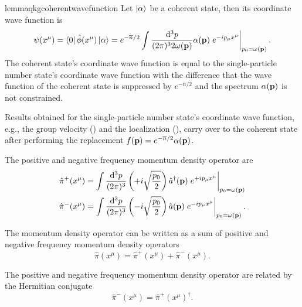\begin{restatable}{lemma}{qkgcoherentwavefunction}\label{thm:coherent_state_wave_function}
	Let $\ket{\alpha}$ be a coherent state, then its coordinate wave function is
	\begin{equation}
		\psi(x^\mu)
		=
		\bra{0}
		\hat\phi(x^\mu)
		\ket{\alpha}
		=
		e^{-\overline{n}/2}
		\int\frac{\dd[3]{p}}{(2\pi)^32\omega(\vb{p})}
		\alpha(\vb{p})
		\eval{e^{-ip_\mu x^\mu}}_{p_0=\omega(\vb{p})}
		.
	\end{equation}
	The coherent state's coordinate wave function is equal to the single-particle number state's coordinate wave function with the difference that the wave function of the coherent state is suppressed by $e^{-\overline{n}/2}$ and the spectrum $\alpha(\vb{p})$ is not constrained.
\end{restatable}
\begin{corollary}
	Results obtained for the single-particle number state's coordinate wave function, e.g., the group velocity () and the localization (), carry over to the coherent state after performing the replacement $f(\vb{p})=e^{-\overline{n}/2}\alpha(\vb{p})$.
\end{corollary}

\begin{definition}
	The positive and negative frequency momentum density operator are
	\begin{align}
		\hat\pi^+(x^\mu)
		&=
		\int\frac{\dd[3]{p}}{(2\pi)^3}
		\left(
			+
			i\sqrt{\frac{p_0}{2}}
		\right)
		\hat{a}^\dagger(\vb{p})
		\eval{e^{+ip_\mu x^\mu}}_{p_0=\omega(\vb{p})}
		\\
		\hat\pi^-(x^\mu)
		&=
		\int\frac{\dd[3]{p}}{(2\pi)^3}
		\left(
			-
			i\sqrt{\frac{p_0}{2}}
		\right)
		\hat{a}(\vb{p})
		\eval{e^{-ip_\mu x^\mu}}_{p_0=\omega(\vb{p})}
		.
	\end{align}
\end{definition}
\begin{corollary}
	The momentum density operator can be written as a sum of positive and negative frequency momentum density operators
	\begin{equation}
		\hat\pi(x^\mu)
		=
		\hat\pi^+(x^\mu)
		+
		\hat\pi^-(x^\mu)
		.
	\end{equation}
\end{corollary}
\begin{corollary}
	The positive and negative frequency momentum density operator are related by the Hermitian conjugate
	\begin{equation}
		\hat\pi^-(x^\mu)
		=
		\hat\pi^+(x^\mu)^\dagger
		.
	\end{equation}	
\end{corollary}


